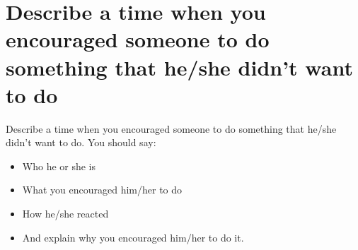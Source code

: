 \section{Describe a time when you encouraged someone to do something that he/she didn't want to do}
\begin{ieltsprompt}
Describe a time when you encouraged someone to do something that he/she didn't want to do.
You should say:
\begin{itemize}[leftmargin=2em, itemsep=2pt]
\item Who he or she is
\item What you encouraged him/her to do
\item How he/she reacted
\item And explain why you encouraged him/her to do it.
\end{itemize}
\end{ieltsprompt}

